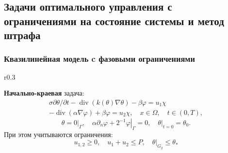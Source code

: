 \subsection{Задачи оптимального управления с ограничениями на состояние системы и метод штрафа}\label{subsec:opt-phase}
\begin{frame}
    \frametitle{Квазилинейная модель c фазовыми ограничениями}
    \begin{wrapfigure}{r}{0.3\textwidth}
    \end{wrapfigure}

    \textbf{Начально-краевая} задача:
    \begin{equation}
        \label{eq:3_2:1}
        \begin{gathered}
            \sigma \partial \theta / \partial t-\operatorname{div}(k(\theta)
            \nabla \theta)-\beta \varphi=u_{1} \chi \\
            -\operatorname{div}(\alpha \nabla \varphi)+\beta \varphi=u_{2}
            \chi, \quad x \in \Omega, \quad t \in(0, T),
        \end{gathered}
    \end{equation}
    \begin{equation}
        \label{eq:3_2:2}
        \theta=\left.0\right|_{\Gamma},
        \quad \alpha \partial_{n} \varphi
        +\left.2^{-1} \varphi\right|_{\Gamma}=0,
        \left.\quad \theta\right|_{t=0}=\theta_{0}.
    \end{equation}
    При этом учитываются ограничения:
    \[ u_{1,2} \geq 0, \quad u_{1}+u_{2} \leq P, \left.\quad \theta\right|_{G_{2}} \leq \theta_{*} \]


\end{frame}
